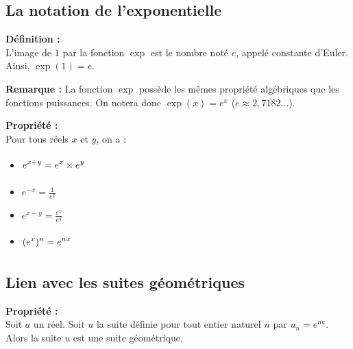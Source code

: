 \documentclass[11pt,a4paper]{article}
\begin{document}
\subsection{La notation de l'exponentielle}

\begin{mdframed}[style=definitionStyle]
    \textbf{Définition :} ~\\
    L'image de $1$ par la fonction $\exp$ est le nombre noté $e$, appelé constante d'Euler. Ainsi, $\exp(1)=e$.
\end{mdframed}

\textbf{Remarque :} La fonction $\exp$ possède les mêmes propriété algébriques que les fonctions puissances. On notera donc $\exp(x)=e^x$ ($e\approx2,7182\dots$).

\begin{mdframed}[style=proprieteStyle]
    \textbf{Propriété :} ~\\
    Pour tous réels $x$ et $y$, on a : \\

    \begin{minipage}{0.25\textwidth}
        \begin{itemize}
            \item $\displaystyle e^{x+y}=e^x\times e^y \color{white}\frac{e^x}{e^y}$ 
            \item $\displaystyle e^{-x}=\frac{1}{e^x}$
        \end{itemize}
    \end{minipage}
    \hfill
    \begin{minipage}{0.8\textwidth}
        \begin{itemize}
            \item $\displaystyle e^{x-y}=\frac{e^x}{e^y}$ 
            \item $\displaystyle (e^x)^n=e^{nx}\color{white}\frac{e^x}{e^y}$ 
        \end{itemize}
    \end{minipage}
\end{mdframed}

\subsection{Lien avec les suites géométriques}

\begin{mdframed}[style=proprieteStyle]
    \textbf{Propriété :} ~\\
    Soit $a$ un réel. Soit $u$ la suite définie pour tout entier naturel $n$ par $u_n=e^{na}$. \\
    Alors la suite $u$ est une suite géométrique.
\end{mdframed}
\end{document}
